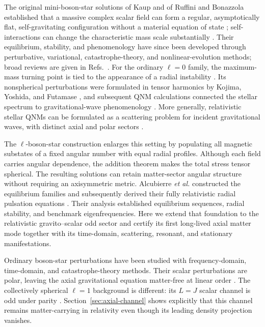 \documentclass[aps,prd,preprint,onecolumn,nofootinbib,superscriptaddress,showkeys]{revtex4-2}
\begin{document}
The original mini-boson-star solutions of Kaup and of Ruffini and Bonazzola established that a massive complex scalar field can form a regular, asymptotically flat, self-gravitating configuration without a material equation of state \cite{Kaup1968,Ruffini1969}; self-interactions can change the characteristic mass scale substantially \cite{Colpi1986}. Their equilibrium, stability, and phenomenology have since been developed through perturbative, variational, catastrophe-theory, and nonlinear-evolution methods; broad reviews are given in Refs.~\cite{Jetzer1992,LeePang1992,Schunck2003,Liebling2012}. For the ordinary $\ell=0$ family, the maximum-mass turning point is tied to the appearance of a radial instability \cite{Gleiser1988,Gleiser1989,Kusmartsev1991,SeidelSuen1990,Hawley2000}.  Its nonspherical perturbations were formulated in tensor harmonics by Kojima, Yoshida, and Futamase \cite{Kojima1991}, and subsequent QNM calculations connected the stellar spectrum to gravitational-wave phenomenology \cite{Yoshida1994,Macedo2013,Macedo2016,Cardoso2016}.  More generally, relativistic stellar QNMs can be formulated as a scattering problem for incident gravitational waves, with distinct axial and polar sectors \cite{ChandrasekharFerrari1991}.

The $\ell$-boson-star construction enlarges this setting by populating all magnetic substates of a fixed angular number with equal radial profiles. Although each field carries angular dependence, the addition theorem makes the total stress tensor spherical. The resulting solutions can retain matter-sector angular structure without requiring an axisymmetric metric. Alcubierre \emph{et al.} constructed the equilibrium families and subsequently derived their fully relativistic radial pulsation equations \cite{Alcubierre2018,Alcubierre2021}. Their analysis established equilibrium sequences, radial stability, and benchmark eigenfrequencies. Here we extend that foundation to the relativistic gravito--scalar odd sector and certify its first long-lived axial matter mode together with its time-domain, scattering, resonant, and stationary manifestations.

Ordinary boson-star perturbations have been studied with frequency-domain, time-domain, and catastrophe-theory methods.  Their scalar perturbations are polar, leaving the axial gravitational equation matter-free at linear order \cite{Kojima1991,Yoshida1994,Macedo2016}.  The collectively spherical $\ell=1$ background is different: its $L=J$ scalar channel is odd under parity \cite{ChavezNambo2024}.  Section~\ref{sec:axial-channel} shows explicitly that this channel remains matter-carrying in relativity even though its leading density projection vanishes.
\end{document}
